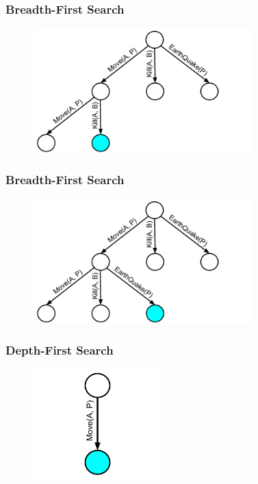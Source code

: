\documentclass{beamer}
\begin{document}
\begin{frame}[fragile]
\frametitle{Breadth-First Search}
\begin{figure}[h]
	\includegraphics[width=8.5cm]{Diagrams/BreadthFirst/BreadthTreeFive.pdf}
	\centering
\end{figure}
\end{frame}

\begin{frame}[fragile]
\frametitle{Breadth-First Search}
\begin{figure}[h]
	\includegraphics[width=8.5cm]{Diagrams/BreadthFirst/BreadthTreeSix.pdf}
	\centering
\end{figure}
\end{frame}


\begin{frame}[fragile]
\frametitle{Depth-First Search}
\begin{figure}[h]
	\includegraphics[width=5cm]{Diagrams/DepthFirst/DepthFirstOne.pdf}
	\centering
\end{figure}
\end{frame}
\end{document}
